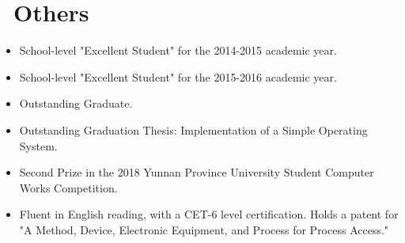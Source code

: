 \documentclass{resume}
\begin{document}


\section{\faInfo\ Others}
\begin{itemize}[parsep=0.5ex]
  \item School-level "Excellent Student" for the 2014-2015 academic year.
  \item School-level "Excellent Student" for the 2015-2016 academic year.
  \item Outstanding Graduate.
  \item Outstanding Graduation Thesis: Implementation of a Simple Operating System.
  \item Second Prize in the 2018 Yunnan Province University Student Computer Works Competition.
  \item Fluent in English reading, with a CET-6 level certification. Holds a patent for "A Method, Device, Electronic Equipment, and Process for Process Access."
\end{itemize}

%
%
\end{document}
